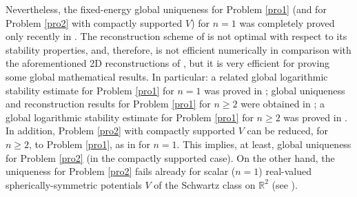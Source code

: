 \documentclass[11pt,a4paper,english,subeqn]{amsart}
\theoremstyle{plain}
\theoremstyle{definition}
\numberwithin{equation}{section}
\begin{document}
Nevertheless, the fixed-energy global uniqueness for Problem \ref{pro1} (and for Problem \ref{pro2} with compactly supported $V$) for $n=1$ was completely proved only recently in \cite{B}. The reconstruction scheme of \cite{B} is not optimal with respect to its stability properties, and, therefore, is not efficient numerically in comparison with the aforementioned 2D reconstructions of \cite{N1,N2,N3,N4}, but it is very efficient for proving some global mathematical results. In particular: a related global logarithmic stability estimate for Problem \ref{pro1} for $n=1$ was proved in \cite{NS1}; global uniqueness and reconstruction results for Problem \ref{pro1} for $n \geq 2$ were obtained in \cite{NS2}; a global logarithmic stability estimate for Problem \ref{pro1} for $n \geq 2$ was proved in \cite{S}. In addition, Problem \ref{pro2} with compactly supported $V$ can be reduced, for $n \geq 2$, to Problem \ref{pro1}, as in \cite{N1} for $n=1$. This implies, at least, global uniqueness for Problem \ref{pro2} (in the compactly supported case). On the other hand, the uniqueness for Problem \ref{pro2} fails already for scalar ($n=1$) real-valued spherically-symmetric potentials $V$ of the Schwartz class on ${\mathbb{R}}^2$ (see \cite{GN}).\smallskip
\end{document}
